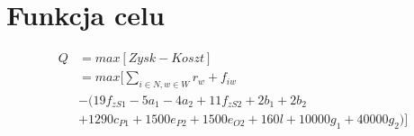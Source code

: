 \section{Funkcja celu}
\begin{align*}
Q &= max[Zysk - Koszt] \\
&= max[\sum_{i \in N, w \in W} r_w + f_{iw} \\
&- (19f_{zS1} - 5a_1 - 4a_2 + 11f_{zS2} + 2b_1 + 2b_2 \\
&+ 1290c_{P1} + 1500e_{P2} +1500e_{O2} + 160l + 10000g_1 + 40000g_2)] 
\end{align*}

